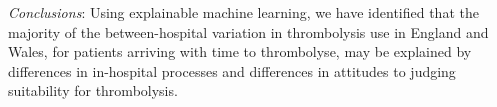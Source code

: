 \emph{Conclusions}: Using explainable machine learning, we have identified that the majority of the between-hospital variation in thrombolysis use in England and Wales, for patients arriving with time to thrombolyse, may be explained by differences in in-hospital processes and differences in attitudes to judging suitability for thrombolysis.